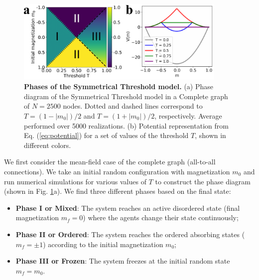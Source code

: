 	\begin{figure}[t]
		\centering
		\includegraphics[width=0.9\textwidth]{Figs/Aging_STM/FIG1.pdf}
		\caption{\textbf{Phases of the Symmetrical Threshold model.} (a) Phase diagram of the Symmetrical Threshold model in a Complete graph of $N = 2500$ nodes. Dotted and dashed lines correspond to $T = (1-|m_0|)/2$ and $T = (1+|m_0|)/2$, respectively. Average performed over 5000 realizations. (b) Potential representation from Eq. (\ref{eq:potential}) for a set of values of the threshold $T$, shown in different colors.}
		\label{COM_LAT_PD}
	\end{figure}
	
	We first consider the mean-field case of the complete graph (all-to-all connections). We take an initial random configuration with magnetization $m_0$ and run numerical simulations for various values of $T$ to construct the phase diagram (shown in Fig. \ref{COM_LAT_PD}a). We find three different phases based on the final state:
	\pagebreak
	\begin{itemize}
		\item \textbf{Phase I or Mixed}: The system reaches an active disordered state (final magnetization $m_f = 0$) where the agents change their state continuously;
		\item \textbf{Phase II or Ordered}: The system reaches the ordered absorbing states ($m_f = \pm 1$) according to the initial magnetization $m_0$;
		\item \textbf{Phase III or Frozen}: The system freezes at the initial random state $m_f = m_0$.
	\end{itemize}
	
